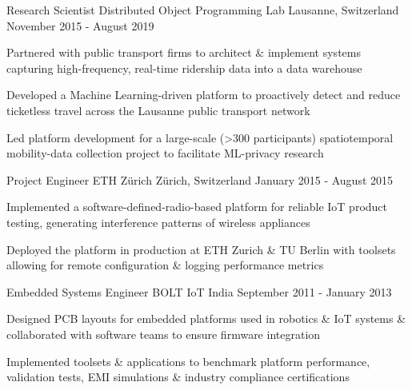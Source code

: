 \begin{cventries}
   \vspace{-0.1cm}

  \cventry
    {Research Scientist} %
    {Distributed Object Programming Lab} %
    {Lausanne, Switzerland} %
    {November 2015 - August 2019} %
    {
      \begin{cvitems} %
      	\item {Partnered with public transport firms to architect \& implement systems capturing high-frequency, real-time ridership data into a data warehouse}
      	\item {Developed a Machine Learning-driven platform to proactively detect and reduce ticketless travel across the Lausanne public transport network}
        \item {Led platform development for a large-scale (>300 participants) spatiotemporal mobility-data collection project to facilitate ML-privacy research}
      \end{cvitems}
    }

	\vspace{-0.1cm}

  \cventry
    {Project Engineer} %
    {ETH Zürich} %
    {Zürich, Switzerland} %
    {January 2015 - August 2015} %
    {
      \begin{cvitems} %
      	\item {Implemented a software-defined-radio-based platform for reliable IoT product testing, generating interference patterns of wireless appliances}
        \item {Deployed the platform in production at ETH Zurich \& TU Berlin with toolsets allowing for remote configuration \& logging performance metrics}
      \end{cvitems}
    }
    
  \vspace{-0.1cm}

  \cventry
    {Embedded Systems Engineer} %
    {BOLT IoT} %
    {India} %
    {September 2011 - January 2013} %
    {
      \begin{cvitems} %
      	\item {Designed PCB layouts for embedded platforms used in robotics \& IoT systems \& collaborated with software teams to ensure firmware integration}
        \item {Implemented toolsets \& applications to benchmark platform performance, validation tests, EMI simulations \& industry compliance certifications}
      \end{cvitems}
    }
    

\end{cventries}
